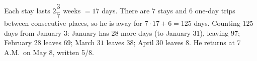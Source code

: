 Each stay lasts $2\dfrac{3}{7}$ weeks $=17$ days. There are $7$ stays and $6$ one-day trips between consecutive places, so he is away for $7\cdot17+6=125$ days. Counting $125$ days from January $3$: January has $28$ more days (to January $31$), leaving $97$; February $28$ leaves $69$; March $31$ leaves $38$; April $30$ leaves $8$. He returns at 7 A.M.\ on $\boxed{\text{May }8}$, written 5/8.
